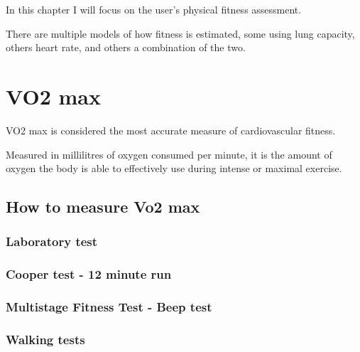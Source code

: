 In this chapter I will focus on the user's physical fitness assessment.

There are multiple models of how fitness is estimated, some using lung capacity, others heart rate, and others a combination of the two.

\section{VO2 max}
VO2 max is considered the most accurate measure of cardiovascular fitness.

Measured in millilitres of oxygen consumed per minute, it is the amount of oxygen the body is able to effectively use during intense or maximal exercise.\cite{vo2max-definition}

\subsection{How to measure Vo2 max}

\subsubsection*{Laboratory test}
\subsubsection*{Cooper test - 12 minute run}
\subsubsection*{Multistage Fitness Test - Beep test}
\subsubsection*{Walking tests}